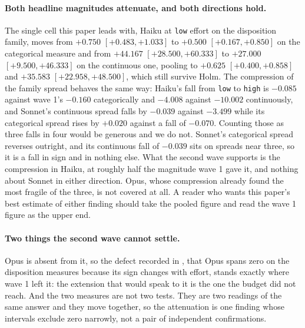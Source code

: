 \paragraph{Both headline magnitudes attenuate, and both directions hold.}
The single cell this paper leads with, Haiku at \texttt{low} effort on the
disposition family, moves from $+0.750$ $[+0.483, +1.033]$ to $+0.500$
$[+0.167, +0.850]$ on the categorical measure and from $+44.167$ $[+28.500,
+60.333]$ to $+27.000$ $[+9.500, +46.333]$ on the continuous one, pooling to
$+0.625$ $[+0.400, +0.858]$ and $+35.583$ $[+22.958, +48.500]$, which still
survive Holm. The compression of the family spread behaves the same way:
Haiku's fall from \texttt{low} to \texttt{high} is $-0.085$ against wave 1's
$-0.160$ categorically and $-4.008$ against $-10.002$ continuously, and
Sonnet's continuous spread falls by $-0.039$ against $-3.499$ while its
categorical spread rises by $+0.020$ against a fall of $-0.070$. Counting
those as three falls in four would be generous and we do not. Sonnet's
categorical spread reverses outright, and its continuous fall of $-0.039$
sits on spreads near three, so it is a fall in sign and in nothing else.
What the second wave supports is the compression in Haiku, at roughly half
the magnitude wave 1 gave it, and nothing about Sonnet in either direction.
Opus, whose compression  already found the most fragile of
the three, is not covered at all. A reader who wants this paper's best
estimate of either finding should take the pooled figure and read the wave 1
figure as the upper end.

\paragraph{Two things the second wave cannot settle.} Opus is absent from it,
so the defect recorded in , that Opus spans zero on
the disposition measures because its sign changes with effort, stands exactly
where wave 1 left it: the extension that would speak to it is the one the
budget did not reach. And the two measures are not two tests. They are two
readings of the same answer and they move together, so the attenuation is one
finding whose intervals exclude zero narrowly, not a pair of independent
confirmations.
